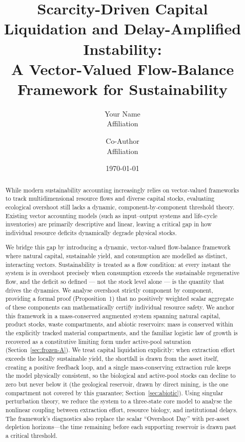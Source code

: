 \documentclass[twocolumn,10pt]{article}
\title{Scarcity-Driven Capital Liquidation and Delay-Amplified Instability: \\
       A Vector-Valued Flow-Balance Framework for Sustainability}
\author{Your Name \\ \small{Affiliation} \and Co-Author \\ \small{Affiliation}}
\date{\today}
\begin{document}
\maketitle

\begin{abstract}
While modern sustainability accounting increasingly relies on vector-valued frameworks to track multidimensional resource flows and diverse capital stocks, evaluating ecological overshoot still lacks a dynamic, component-by-component threshold theory. Existing vector accounting models (such as input--output systems and life-cycle inventories) are primarily descriptive and linear, leaving a critical gap in how individual resource deficits dynamically degrade physical stocks.

We bridge this gap by introducing a dynamic, vector-valued flow-balance framework where natural capital, sustainable yield, and consumption are modelled as distinct, interacting vectors. Sustainability is treated as a flow condition: at every instant the system is in overshoot precisely when consumption exceeds the sustainable regenerative flow, and the deficit so defined --- not the stock level alone --- is the quantity that drives the dynamics. We analyse overshoot strictly component by component, providing a formal proof (Proposition~1) that no positively weighted scalar aggregate of these components can mathematically certify individual resource safety. We anchor this framework in a mass-conserved augmented system spanning natural capital, product stocks, waste compartments, and abiotic reservoirs: mass is conserved within the explicitly tracked material compartments, and the familiar logistic law of growth is recovered as a constitutive limiting form under active-pool saturation (Section~\ref{sec:frozen-A}). We treat capital liquidation explicitly: when extraction effort exceeds the locally sustainable yield, the shortfall is drawn from the asset itself, creating a positive feedback loop, and a single mass-conserving extraction rule keeps the model physically consistent, so the biological and active-pool stocks can decline to zero but never below it (the geological reservoir, drawn by direct mining, is the one compartment not covered by this guarantee; Section~\ref{sec:abiotic}). Using singular perturbation theory, we reduce the system to a three-state core model to analyse the nonlinear coupling between extraction effort, resource biology, and institutional delays. The framework's diagnostics also replace the scalar ``Overshoot Day'' with per-asset depletion horizons---the time remaining before each supporting reservoir is drawn past a critical threshold.


\end{abstract}
\end{document}
